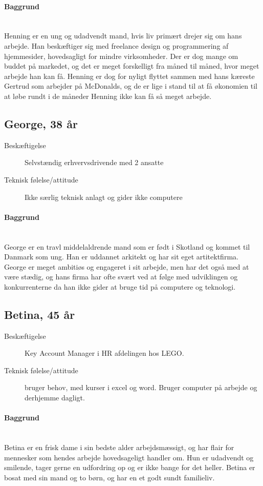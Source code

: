 \documentclass[a4paper,titlepage,fleqn,12pt]{article}
\begin{document}
\paragraph{Baggrund}\hfill\\Henning er en ung og udadvendt mand, hvis liv primært drejer sig om hans arbejde. Han beskæftiger sig med freelance design og programmering af hjemmesider, hovedsagligt for mindre virksomheder. Der er dog mange om buddet på markedet, og det er meget forskelligt fra måned til måned, hvor meget arbejde han kan få. Henning er dog for nyligt flyttet sammen med hans kæreste Gertrud som arbejder på McDonalds, og de er lige i stand til at få økonomien til at løbe rundt i de måneder Henning ikke kan få så meget arbejde.

\subsection{George, 38 år}
\begin{description}
	\item[Beskæftigelse] Selvstændig erhvervsdrivende med 2 ansatte
	\item[Teknisk følelse/attitude] Ikke særlig teknisk anlagt og gider ikke computere
\end{description}
\paragraph{Baggrund}\hfill\\
George er en travl middelaldrende mand som er født i Skotland og kommet til Danmark som ung. Han er uddannet arkitekt og har sit eget artitektfirma. George er meget ambitiøs og engageret i sit arbejde, men har det også med at være stædig, og hans firma har ofte svært ved at følge med udviklingen og konkurrenterne da han ikke gider at bruge tid på computere og teknologi. 

\subsection{Betina, 45 år}
\begin{description}
	\item[Beskæftigelse] Key Account Manager i HR afdelingen hos LEGO. \item[Teknisk følelse/attitude] bruger behov, med kurser i excel og word. Bruger computer på arbejde og derhjemme dagligt.
\end{description}
\paragraph{Baggrund}\hfill\\
Betina er en frisk dame i sin bedste alder arbejdsmæssigt, og har flair for mennesker som hendes arbejde hovedsageligt handler om. Hun er udadvendt og smilende, tager gerne en udfordring op og er ikke bange for det heller. Betina er bosat med sin mand og to børn, og har en et godt sundt familieliv.
\end{document}
